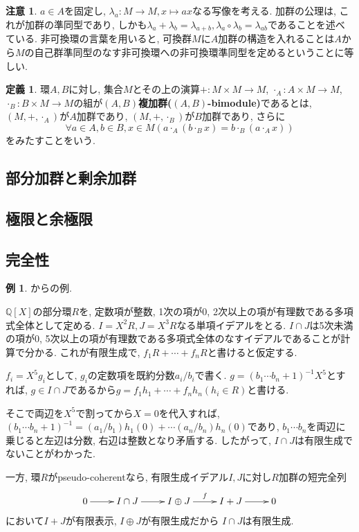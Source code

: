 \documentclass[a4paper, twoside]{bxjsarticle}
\newcommand{\quo}{\mathbb{Q}}
\newcommand{\tb}{\textbf}
\theoremstyle{definition}
\newtheorem{defn}[thm]{定義}
\newtheorem{exm}[thm]{例}
\newtheorem{rem}[thm]{注意}
\begin{document}
        \begin{rem}
            $a\in A$を固定し, $\lambda_a\colon M\to M, x\mapsto ax$なる写像を考える. 加群の公理は, これが加群の準同型であり, しかも$\lambda_a+\lambda_b = \lambda_{a+b}, \lambda_a\circ \lambda_b = \lambda_{ab}$であることを述べている. 非可換環の言葉を用いると, 可換群$M$に$A$加群の構造を入れることは$A$から$M$の自己群準同型のなす非可換環への非可換環準同型を定めるということに等しい.
        \end{rem}
        \begin{defn}
            環$A, B$に対し, 集合$M$とその上の演算$+\colon M\times M\to M$, $\cdot_A\colon A\times M\to M$, $\cdot_B\colon B\times M\to M$の組が\tb{$(A, B)$複加群($(A, B)$-bimodule)}であるとは, $(M, +, \cdot_A)$が$A$加群であり, $(M, +, \cdot_B)$が$B$加群であり, さらに\[\forall a\in A, b\in B, x\in M (a\cdot_A (b\cdot_B x)=b\cdot_B (a\cdot_A x))\]をみたすことをいう.
        \end{defn}

        \subsection{部分加群と剰余加群}
        \subsection{極限と余極限}
        \subsection{完全性}

        \begin{exm}
            \cite{intersectionofness}からの例. 
            
            $\quo[X]$の部分環$R$を, 定数項が整数, 1次の項が0, 2次以上の項が有理数である多項式全体として定める. $I=X^2 R, J=X^3 R$なる単項イデアルをとる. $I\cap J$は5次未満の項が0, 5次以上の項が有理数である多項式全体のなすイデアルであることが計算で分かる. これが有限生成で, $f_1 R+\cdots+f_n R$と書けると仮定する.
            
            $f_i = X^5 g_i$として, $g_i$の定数項を既約分数$a_i/b_i$で書く. $g=(b_1\cdots b_n + 1)^{-1} X^5$とすれば, $g\in I\cap J$であるから$g=f_1 h_1 +\cdots+f_n h_n (h_i\in R)$と書ける.

            そこで両辺を$X^5$で割ってから$X=0$を代入すれば, $(b_1\cdots b_n+1)^{-1} = (a_1/b_1) h_1(0)+\cdots (a_n/b_n) h_n(0)$であり, $b_1\cdots b_n$を両辺に乗じると左辺は分数, 右辺は整数となり矛盾する. したがって, $I\cap J$は有限生成でないことがわかった.

            一方, 環$R$がpseudo-coherentなら, 有限生成イデアル$I, J$に対し$R$加群の短完全列\[\xymatrix{0 \ar[r] & I\cap J \ar[r] & I\oplus J \ar[r]^f & I+J \ar[r] & 0}\]において$I+J$が有限表示, $I\oplus J$が有限生成だから $I\cap J$は有限生成.
        \end{exm}
\end{document}

